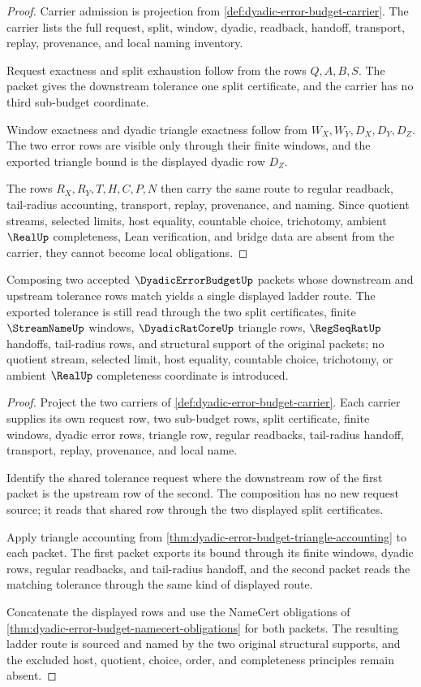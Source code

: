 \begin{proof}
Carrier admission is projection from \autoref{def:dyadic-error-budget-carrier}. The carrier lists the full request, split, window, dyadic, readback, handoff, transport, replay, provenance, and local naming inventory.

Request exactness and split exhaustion follow from the rows $Q,A,B,S$. The packet gives the downstream tolerance one split certificate, and the carrier has no third sub-budget coordinate.

Window exactness and dyadic triangle exactness follow from $W_X,W_Y,D_X,D_Y,D_Z$. The two error rows are visible only through their finite windows, and the exported triangle bound is the displayed dyadic row $D_Z$.

The rows $R_X,R_Y,T,H,C,P,N$ then carry the same route to regular readback, tail-radius accounting, transport, replay, provenance, and naming. Since quotient streams, selected limits, host equality, countable choice, trichotomy, ambient $\RealUp$ completeness, Lean verification, and bridge data are absent from the carrier, they cannot become local obligations.
\end{proof}

\begin{theorem}
\label{thm:dyadic-error-budget-ladder-composition}
Composing two accepted $\DyadicErrorBudgetUp$ packets whose downstream and upstream tolerance rows match yields a single displayed ladder route. The exported tolerance is still read through the two split certificates, finite $\StreamNameUp$ windows, $\DyadicRatCoreUp$ triangle rows, $\RegSeqRatUp$ handoffs, tail-radius rows, and structural support of the original packets; no quotient stream, selected limit, host equality, countable choice, trichotomy, or ambient $\RealUp$ completeness coordinate is introduced.
\end{theorem}
\begin{proof}
Project the two carriers of \autoref{def:dyadic-error-budget-carrier}. Each carrier supplies its own request row, two sub-budget rows, split certificate, finite windows, dyadic error rows, triangle row, regular readbacks, tail-radius handoff, transport, replay, provenance, and local name.

Identify the shared tolerance request where the downstream row of the first packet is the upstream row of the second. The composition has no new request source; it reads that shared row through the two displayed split certificates.

Apply triangle accounting from \autoref{thm:dyadic-error-budget-triangle-accounting} to each packet. The first packet exports its bound through its finite windows, dyadic rows, regular readbacks, and tail-radius handoff, and the second packet reads the matching tolerance through the same kind of displayed route.

Concatenate the displayed rows and use the NameCert obligations of \autoref{thm:dyadic-error-budget-namecert-obligations} for both packets. The resulting ladder route is sourced and named by the two original structural supports, and the excluded host, quotient, choice, order, and completeness principles remain absent.
\end{proof}

